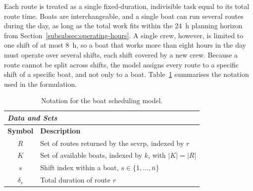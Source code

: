 \documentclass[12pt]{article}
\begin{document}
Each route is treated as a single fixed-duration, indivisible task equal to its total route time. Boats are interchangeable, and a single boat can run several routes during the day, as long as the total work fits within the \qty{24}{\hour} planning horizon from Section~\ref{subsubsec:operating-hours}. A single crew, however, is limited to one shift of at most \qty{8}{\hour}, so a boat that works more than eight hours in the day must operate over several shifts, each shift covered by a new crew. Because a route cannot be split across shifts, the model assigns every route to a specific shift of a specific boat, and not only to a boat. Table~\ref{tab:scheduling_notation} summarises the notation used in the formulation.

\begin{table}[htbp]
  \centering
  \caption{Notation for the boat scheduling model.}
  \label{tab:scheduling_notation}
  \renewcommand{\arraystretch}{1.3}
  \begin{tabularx}{\textwidth}{c X l}
    \toprule

    \multicolumn{3}{l}{\textbf{\textit{Data and Sets}}}                                                                                                                           \\
    \midrule
    \textbf{Symbol} & \textbf{Description}                                                                                                                                        \\
    \midrule
    \(R\)           & \multicolumn{2}{l}{Set of routes returned by the \ac{scvrp}, indexed by \(r\)}                                                                              \\
    \(K\)           & \multicolumn{2}{l}{Set of available boats, indexed by \(k\), with \(|K| = |R|\)}                                                                            \\
    \(s\)           & \multicolumn{2}{l}{Shift index within a boat, \(s \in \{1, \ldots, \bar{n}\}\)}                                                                             \\
    \(\delta_r\)    & \multicolumn{2}{l}{Total duration of route \(r\)}                                                                                                           \\
    \midrule


\end{tabularx}
\end{table}
\end{document}
